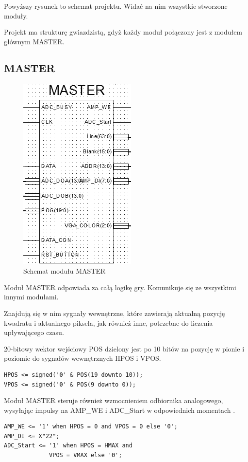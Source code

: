 \documentclass[11pt]{article}
\begin{document}
Powyższy rysunek to schemat projektu.
Widać na nim wszystkie stworzone moduły.

Projekt ma strukturę gwiazdzistą, gdyż każdy moduł połączony jest z modułem głównym MASTER.

\subsection{MASTER}

\begin{figure}[H]
\center
\includegraphics[scale=1]{MASTER.png}
\caption{Schemat modułu MASTER}
\end{figure}

Moduł MASTER odpowiada za całą logikę gry.
Komunikuje się ze wszystkimi innymi modułami.

Znajdują się w nim sygnały wewnętrzne, które zawierają aktualną pozycję kwadratu i aktualnego piksela, jak również inne, potrzebne do liczenia upływającego czasu.

20-bitowy wektor wejściowy POS dzielony jest po 10 bitów na pozycję w pionie i poziomie do sygnałów wewnętrznych HPOS i VPOS.

\begin{lstlisting}[caption=Pobranie aktualnego adresu]
HPOS <= signed('0' & POS(19 downto 10));
VPOS <= signed('0' & POS(9 downto 0));
\end{lstlisting}

Moduł MASTER steruje również wzmocnieniem odbiornika analogowego, wysyłając impulsy na AMP\_WE i ADC\_Start w odpowiednich momentach \cite{pa}.

\begin{lstlisting}[caption=Sterowanie wzmocnieniem obiornika analogowo-cyfrowego]
AMP_WE <= '1' when HPOS = 0 and VPOS = 0 else '0';
AMP_DI <= X"22";
ADC_Start <= '1' when HPOS = HMAX and
             VPOS = VMAX else '0';
\end{lstlisting}
\end{document}

